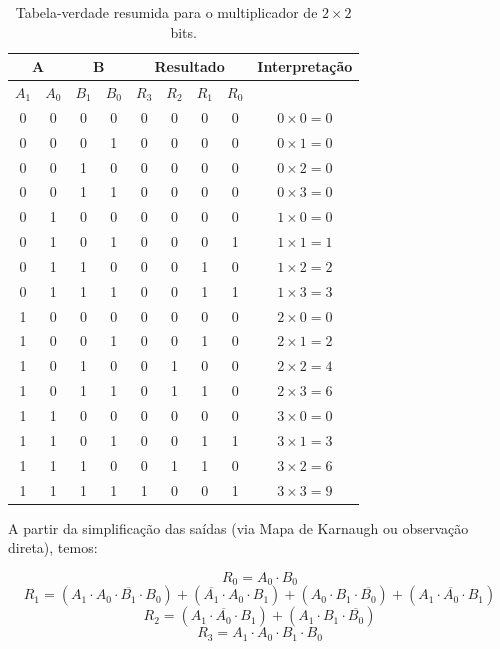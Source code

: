 \documentclass[12pt]{article}
\begin{document}
\begin{table}[h] 
\centering 
\begin{tabular}{|c c|c c|c c c c|c|} 
\hline 
\multicolumn{2}{|c|}{\textbf{A}} & \multicolumn{2}{c|}{\textbf{B}} & \multicolumn{4}{c|}{\textbf{Resultado}} & \textbf{Interpretação} \\ 
\hline 
$A_1$ & $A_0$ & $B_1$ & $B_0$ & $R_3$ & $R_2$ & $R_1$ & $R_0$ & \\
\hline 
0 & 0 & 0 & 0 & 0 & 0 & 0 & 0 & $0 \times 0 = 0$ \\ 
0 & 0 & 0 & 1 & 0 & 0 & 0 & 0 & $0 \times 1 = 0$ \\ 
0 & 0 & 1 & 0 & 0 & 0 & 0 & 0 & $0 \times 2 = 0$ \\ 
0 & 0 & 1 & 1 & 0 & 0 & 0 & 0 & $0 \times 3 = 0$ \\ 
0 & 1 & 0 & 0 & 0 & 0 & 0 & 0 & $1 \times 0 = 0$ \\ 
0 & 1 & 0 & 1 & 0 & 0 & 0 & 1 & $1 \times 1 = 1$ \\ 
0 & 1 & 1 & 0 & 0 & 0 & 1 & 0 & $1 \times 2 = 2$ \\ 
0 & 1 & 1 & 1 & 0 & 0 & 1 & 1 & $1 \times 3 = 3$ \\ 
1 & 0 & 0 & 0 & 0 & 0 & 0 & 0 & $2 \times 0 = 0$ \\ 
1 & 0 & 0 & 1 & 0 & 0 & 1 & 0 & $2 \times 1 = 2$ \\ 
1 & 0 & 1 & 0 & 0 & 1 & 0 & 0 & $2 \times 2 = 4$ \\ 
1 & 0 & 1 & 1 & 0 & 1 & 1 & 0 & $2 \times 3 = 6$ \\ 
1 & 1 & 0 & 0 & 0 & 0 & 0 & 0 & $3 \times 0 = 0$ \\ 
1 & 1 & 0 & 1 & 0 & 0 & 1 & 1 & $3 \times 1 = 3$ \\ 
1 & 1 & 1 & 0 & 0 & 1 & 1 & 0 & $3 \times 2 = 6$ \\ 
1 & 1 & 1 & 1 & 1 & 0 & 0 & 1 & $3 \times 3 = 9$ \\
\hline
\end{tabular}
\caption{Tabela-verdade resumida para o multiplicador de $2 \times 2$ bits.}
\label{tab:multiplicador-2x2}
\end{table}

A partir da simplificação das saídas (via Mapa de Karnaugh ou observação direta), temos:

\[ R_0 = A_0 \cdot B_0 \] 
\[ R_1 = (A_1 \cdot A_0 \cdot \overline{B_1} \cdot B_0) + (\overline{A_1} \cdot A_0 \cdot B_1) + (A_0 \cdot B_1 \cdot \overline{B_0}) + (A_1 \cdot \overline{A_0} \cdot B_1)\]
\[ R_2 = (A_1 \cdot \overline{A_0} \cdot B_1) + (A_1 \cdot B_1 \cdot \overline{B_0})\]
\[ R_3 = A_1 \cdot A_0 \cdot B_1 \cdot B_0 \]
\end{document}
